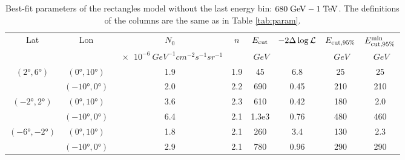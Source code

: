 \begin{table}
  \begin{center}
    \caption{Best-fit parameters of the rectangles model without the last energy bin: $680\;{\rm GeV} - 1\;{\rm TeV}$.
    The definitions of the columns are the same as in Table \ref{tab:param}.
    }
        \begin{tabular}{|c|c|c|c|c|c|c|c|} %
     	\hline
		 Lat & Lon  & $N_0$ & $n$ & $E_{\rm cut}$ &  $-2 \Delta \log {\mathcal{L}}$ & $E_{\rm cut, 95\%}$ & $E_{\rm cut, 95\%}^{\rm min}$ \\ 
		     &        &  {\small $\SI{e-6}{GeV^{-1}cm^{-2}s^{-1} sr^{-1}}$ }&  & {\small $\SI{}{GeV}$ }& &{\small  $\SI{}{GeV}$ }&{\small  $\SI{}{GeV}$ }\\ 
		\hline
  		$(\ang{2}, \ang{6})$ & $(\ang{0}, \ang{10})$ & 1.9 & 1.9 & 45 & 6.8 &25 & 25\\ 
		& $(\ang{-10}, \ang{0})$ & 2.0 & 2.2 & 690 & 0.45 & 210 & 210\\ 
 		\hline
  		$(\ang{-2}, \ang{2})$ & $(\ang{0}, \ang{10})$ & 3.6 & 2.3  & 610 & 0.42 & 180 & 2.0 \\ 
		& $(\ang{-10}, \ang{0})$ & 6.4 & 2.1 & 1.3e3 & 0.76 & 480 & 460\\ 
 		\hline
  		$(\ang{-6}, \ang{-2})$ & $(\ang{0}, \ang{10})$ & 1.8 & 2.1 & 260 & 3.4 & 130 & 2.3  \\ 
		& $(\ang{-10}, \ang{0})$ & 2.9 & 2.1 & 780 & 0.96 & 290 & 290\\ 
 \hline
    \end{tabular}
  \end{center}
\end{table}
